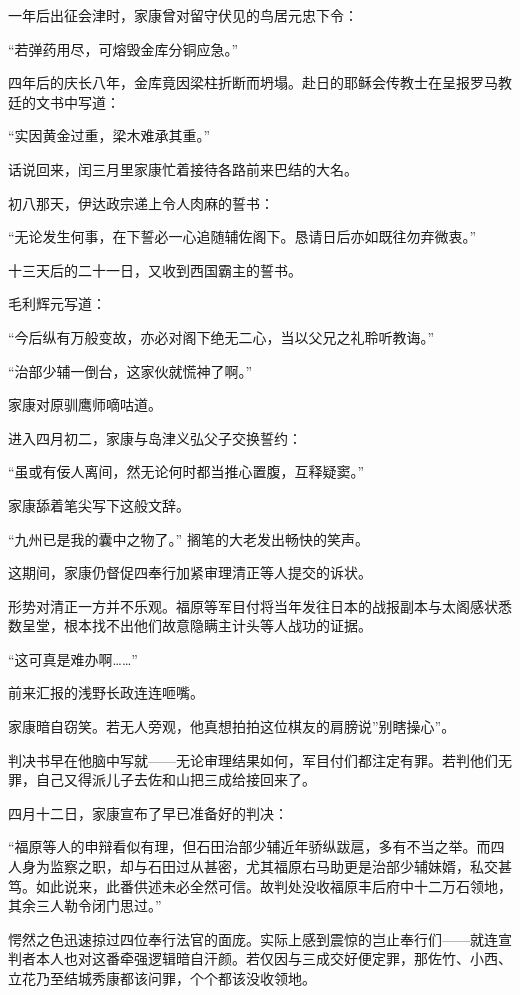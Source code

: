 \documentclass[
]{book}
\begin{document}
一年后出征会津时，家康曾对留守伏见的鸟居元忠下令：

``若弹药用尽，可熔毁金库分铜应急。''

四年后的庆长八年，金库竟因梁柱折断而坍塌。赴日的耶稣会传教士在呈报罗马教廷的文书中写道：

``实因黄金过重，梁木难承其重。''

话说回来，闰三月里家康忙着接待各路前来巴结的大名。

初八那天，伊达政宗递上令人肉麻的誓书：

``无论发生何事，在下誓必一心追随辅佐阁下。恳请日后亦如既往勿弃微衷。''

十三天后的二十一日，又收到西国霸主的誓书。

毛利辉元写道：

``今后纵有万般变故，亦必对阁下绝无二心，当以父兄之礼聆听教诲。''

``治部少辅一倒台，这家伙就慌神了啊。''

家康对原驯鹰师嘀咕道。

进入四月初二，家康与岛津义弘父子交换誓约：

``虽或有佞人离间，然无论何时都当推心置腹，互释疑窦。''

家康舔着笔尖写下这般文辞。

``九州已是我的囊中之物了。'' 搁笔的大老发出畅快的笑声。

这期间，家康仍督促四奉行加紧审理清正等人提交的诉状。

形势对清正一方并不乐观。福原等军目付将当年发往日本的战报副本与太阁感状悉数呈堂，根本找不出他们故意隐瞒主计头等人战功的证据。

``这可真是难办啊\ldots\ldots{}''

前来汇报的浅野长政连连咂嘴。

家康暗自窃笑。若无人旁观，他真想拍拍这位棋友的肩膀说''别瞎操心''。

判决书早在他脑中写就------无论审理结果如何，军目付们都注定有罪。若判他们无罪，自己又得派儿子去佐和山把三成给接回来了。

四月十二日，家康宣布了早已准备好的判决：

``福原等人的申辩看似有理，但石田治部少辅近年骄纵跋扈，多有不当之举。而四人身为监察之职，却与石田过从甚密，尤其福原右马助更是治部少辅妹婿，私交甚笃。如此说来，此番供述未必全然可信。故判处没收福原丰后府中十二万石领地，其余三人勒令闭门思过。''

愕然之色迅速掠过四位奉行法官的面庞。实际上感到震惊的岂止奉行们------就连宣判者本人也对这番牵强逻辑暗自汗颜。若仅因与三成交好便定罪，那佐竹、小西、立花乃至结城秀康都该问罪，个个都该没收领地。
\end{document}
